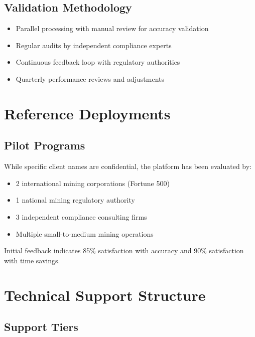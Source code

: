\documentclass[11pt,a4paper]{article}
\begin{document}
\subsection{Validation Methodology}

\begin{itemize}
    \item Parallel processing with manual review for accuracy validation
    \item Regular audits by independent compliance experts
    \item Continuous feedback loop with regulatory authorities
    \item Quarterly performance reviews and adjustments
\end{itemize}

\section{Reference Deployments}

\subsection{Pilot Programs}

\begin{techspec}
While specific client names are confidential, the platform has been evaluated by:
\begin{itemize}
    \item 2 international mining corporations (Fortune 500)
    \item 1 national mining regulatory authority
    \item 3 independent compliance consulting firms
    \item Multiple small-to-medium mining operations
\end{itemize}

Initial feedback indicates 85\% satisfaction with accuracy and 90\% satisfaction with time savings.
\end{techspec}

\section{Technical Support Structure}

\subsection{Support Tiers}
\end{document}
